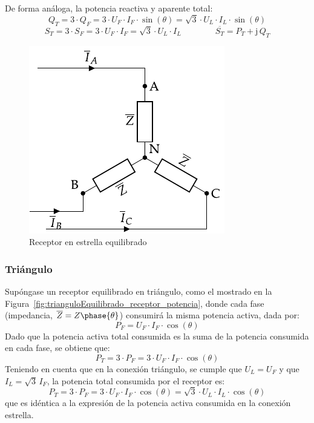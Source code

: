 	
	De forma análoga, la potencia reactiva y aparente total:
	\begin{equation}
	    \boxed{Q_T=3\cdot Q_F=3\cdot U_F\cdot {I_F}\cdot\sin(\theta)=\sqrt{3}\cdot U_L\cdot I_L\cdot\sin(\theta)}
	\end{equation}
	\begin{equation}
	    \boxed{S_T=3\cdot S_F=3\cdot U_F\cdot {I_F}=\sqrt{3}\cdot U_L\cdot I_L}\qquad\qquad \boxed{\overline{S_T}=P_T+\mathrm{j}\,Q_T}
	\end{equation}
	
	\begin{figure}
	    \centering
	    \includegraphics{../figs/EstrellaEquilibrado_Receptor_SN.pdf}
	    \caption{Receptor en estrella equilibrado}
	    \label{fig:estrellaequilibrado_SN_potencia}
	\end{figure}
	
	\subsubsection{Triángulo}
	
	Supóngase un receptor equilibrado en triángulo, como el mostrado en la Figura~\ref{fig:trianguloEquilibrado_receptor_potencia}, donde cada fase (impedancia, $\overline{Z}=Z\phase{\theta}$) consumirá la misma potencia activa, dada por: 
	\begin{equation*}
	    P_F=U_{F}\cdot I_F \cdot \cos(\theta)
	\end{equation*}
	Dado que la potencia activa total consumida es la suma de la potencia consumida en cada fase, se obtiene que:
	\begin{equation*}
	    P_T=3\cdot P_F=3\cdot U_F\cdot I_F\cdot\cos(\theta)
	\end{equation*}
	Teniendo en cuenta que en la conexión triángulo, se cumple que $U_L=U_F$ y que $I_L=\sqrt{3}\,I_F$, la potencia total consumida por el receptor es: 
	\begin{equation}
	    \boxed{P_T=3\cdot P_F=3\cdot U_F\cdot {I_F}\cdot\cos(\theta)=\sqrt{3}\cdot U_L\cdot I_L\cdot\cos(\theta)}
	\end{equation}
	que es idéntica a la expresión de la potencia activa consumida en la conexión estrella.
	
